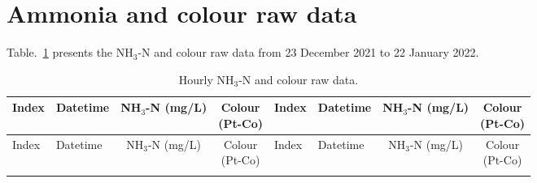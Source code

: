 
\section{Ammonia and colour raw data}

Table.~\ref{raw-nh3-colour-data} presents the NH$_{3}$-N and colour raw data from 23 December 2021 to 22 January 2022.

\begin{center}
    \begin{longtable}{llccllcc}
    \caption{Hourly NH$_{3}$-N and colour raw data.} \label{raw-nh3-colour-data} \\
    \hline
    Index & Datetime & \makecell[c]{NH$_{3}$-N \\ (mg/L)} & \makecell[c]{Colour \\ (Pt-Co)} & Index & Datetime & \makecell[c]{NH$_{3}$-N \\ (mg/L)} & \makecell[c]{Colour \\ (Pt-Co)} \\
    \hline
    \endfirsthead
    
    \hline
    Index & Datetime & \makecell[c]{NH$_{3}$-N \\ (mg/L)} & \makecell[c]{Colour \\ (Pt-Co)} & Index & Datetime & \makecell[c]{NH$_{3}$-N \\ (mg/L)} & \makecell[c]{Colour \\ (Pt-Co)} \\
    \hline
    \endhead
    \hline
    \endfoot
    \hline
    \endlastfoot


\end{longtable}
\end{center}
